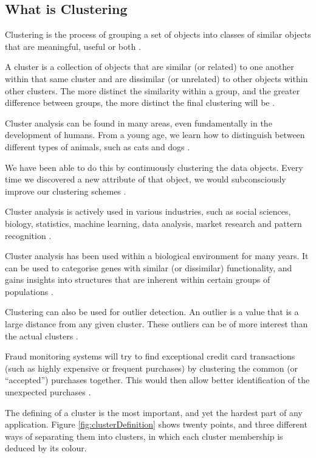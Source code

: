 \subsection{What is Clustering}
Clustering is the process of grouping a set of objects into classes of similar 
objects that are meaningful, useful or both \citep{tan05}.

A cluster is a collection of objects that are similar (or related) to one 
another within that same cluster and are dissimilar (or unrelated) to other 
objects within other clusters. The more distinct the similarity within a group, 
and the greater difference between groups, the more distinct the final clustering 
will be \citep{han06}.

Cluster analysis can be found in many areas, even fundamentally in the 
development of humans. From a young age, we learn how to distinguish between 
different types of animals, such as cats and dogs \citep{han06}. 

We have been able to do this by continuously clustering the data objects. Every
time we discovered a new attribute of that object, we would subconsciously 
improve our clustering schemes \citep{han06}. 

Cluster analysis is actively used in various industries, such as social sciences, 
biology, statistics, machine learning, data analysis, market research and pattern 
recognition \citep{han06}.

Cluster analysis has been used within a biological environment for many years. 
It can be used to categorise genes with similar (or dissimilar) functionality, 
and gains insights into structures that are inherent within certain groups of 
populations \citep{han06}.

Clustering can also be used for outlier detection. An outlier is a value that 
is a large distance from any given cluster. These outliers can be of more 
interest than the actual clusters \citep{tan05}. 

Fraud monitoring systems will try to find exceptional credit card transactions 
(such as highly expensive or frequent purchases) by clustering the common 
(or ``accepted'') purchases together. This would then allow better 
identification of the unexpected purchases \citep{tan05}.

The defining of a cluster is the most important, and yet the hardest part of 
any application. Figure \ref{fig:clusterDefinition} shows twenty points, and 
three different ways of separating them into clusters, in which each cluster 
membership is deduced by its colour.

